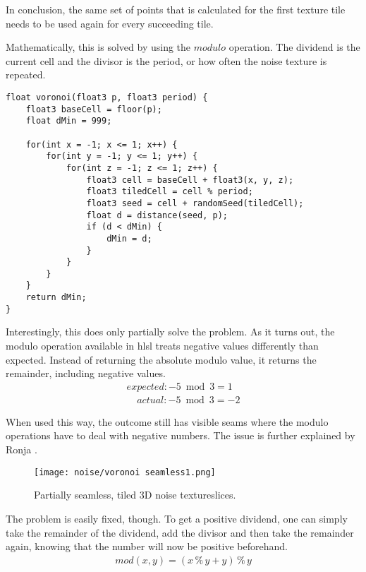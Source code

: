 \noindent
In conclusion, the same set of points that is calculated for the first texture tile needs to be used again for every succeeding tile.

\pagebreak

\noindent
Mathematically, this is solved by using the $modulo$ operation. The dividend is the current cell and the divisor is the period, or how often the \gls{noise} texture is repeated.

\begin{lstlisting}[language=HLSL, caption=Implementation of a partially seamless 3D Voronoi \gls{noise} algorithm., label=lst:shader:noise:voronoi:seamless1]
float voronoi(float3 p, float3 period) {
    float3 baseCell = floor(p);
    float dMin = 999;

    for(int x = -1; x <= 1; x++) {
        for(int y = -1; y <= 1; y++) {
            for(int z = -1; z <= 1; z++) {
                float3 cell = baseCell + float3(x, y, z);
                float3 tiledCell = cell % period;
                float3 seed = cell + randomSeed(tiledCell);
                float d = distance(seed, p);
                if (d < dMin) {
                    dMin = d;
                }
            }
        }
    }
    return dMin;
}
\end{lstlisting}

\noindent
Interestingly, this does only partially solve the problem. As it turns out, the modulo operation available in \gls{hlsl} treats negative values differently than expected.
Instead of returning the absolute modulo value, it returns the remainder, including negative values.
$$
\begin{array}{l}
    expected: -5 \bmod 3 = 1 \\
    \phantom{ex}actual: -5 \bmod 3 = -2
\end{array}
$$

\noindent
When used this way, the outcome still has visible seams where the modulo operations have to deal with negative numbers.
The issue is further explained by Ronja \cite{ronja:tilingnoise}.

\begin{figure}[H]
    \texttt{[image: noise/voronoi seamless1.png]}
    \caption{Partially seamless, tiled 3D \gls{noise} \gls{textureslice}s.}
    \label{img:rnd:noise:seamless1}
\end{figure}

\pagebreak

\noindent
The problem is easily fixed, though. To get a positive dividend, one can simply take the remainder of the dividend, add the divisor and then take the remainder again, knowing that the number will now be positive beforehand.
$$
\begin{array}{l}
    mod(x, y) = (x \mathbin{\%} y + y) \mathbin{\%} y
\end{array}
$$

